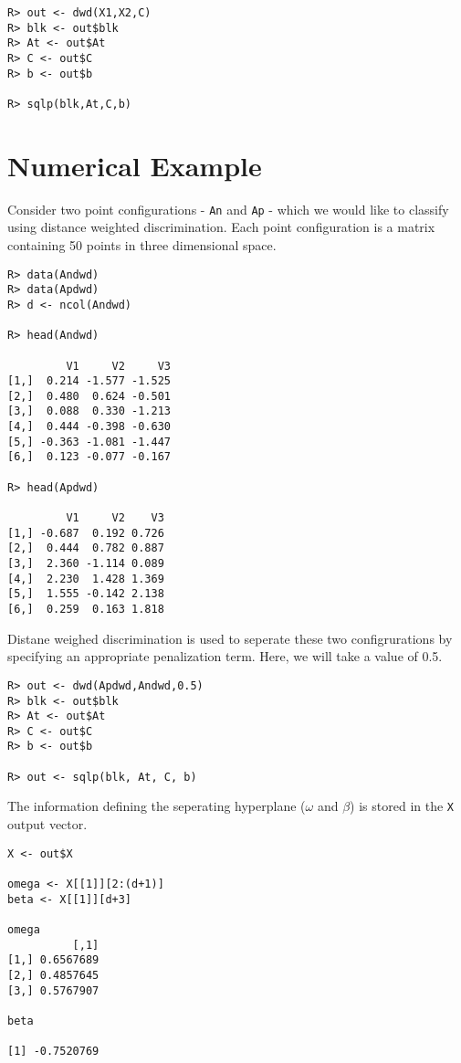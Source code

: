\documentclass{article}
\begin{document}
\begin{verbatim}
R> out <- dwd(X1,X2,C)
R> blk <- out$blk
R> At <- out$At
R> C <- out$C
R> b <- out$b

R> sqlp(blk,At,C,b)
\end{verbatim}

\section*{Numerical Example}

Consider two point configurations - \verb!An! and \verb!Ap! - which we would like to classify using distance weighted discrimination. Each point configuration is a matrix containing 50 points in three dimensional space.

\begin{verbatim}
R> data(Andwd)
R> data(Apdwd)
R> d <- ncol(Andwd)

R> head(Andwd)

         V1     V2     V3
[1,]  0.214 -1.577 -1.525
[2,]  0.480  0.624 -0.501
[3,]  0.088  0.330 -1.213
[4,]  0.444 -0.398 -0.630
[5,] -0.363 -1.081 -1.447
[6,]  0.123 -0.077 -0.167

R> head(Apdwd)

         V1     V2    V3
[1,] -0.687  0.192 0.726
[2,]  0.444  0.782 0.887
[3,]  2.360 -1.114 0.089
[4,]  2.230  1.428 1.369
[5,]  1.555 -0.142 2.138
[6,]  0.259  0.163 1.818
\end{verbatim}

Distane weighed discrimination is used to seperate these two configrurations by specifying an appropriate penalization term. Here, we will take a value of 0.5.

\begin{verbatim}
R> out <- dwd(Apdwd,Andwd,0.5)
R> blk <- out$blk
R> At <- out$At
R> C <- out$C
R> b <- out$b

R> out <- sqlp(blk, At, C, b)
\end{verbatim}

The information defining the seperating hyperplane ($\omega$ and $\beta$) is stored in the \verb!X! output vector. 

\begin{verbatim}
X <- out$X

omega <- X[[1]][2:(d+1)]
beta <- X[[1]][d+3]

omega
          [,1]
[1,] 0.6567689
[2,] 0.4857645
[3,] 0.5767907

beta

[1] -0.7520769
\end{verbatim}



\end{document}
